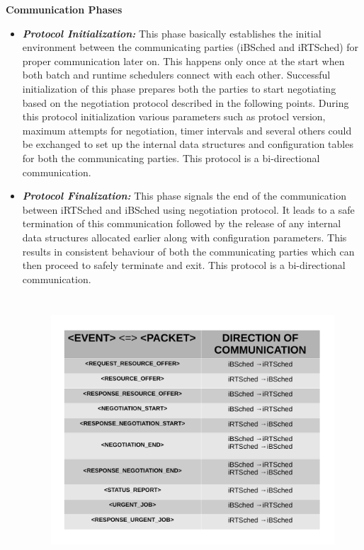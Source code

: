 \textbf{Communication Phases}
\begin{itemize}
\item \textbf{\textit{Protocol Initialization:}} This phase basically establishes the initial environment between the communicating parties (iBSched and iRTSched) for proper communication later on. This happens only once at the start when both batch and runtime schedulers connect with each other. Successful initialization of this phase prepares both the parties to start negotiating based on the negotiation protocol described in the following points. During this protocol initialization various parameters such as protocl version, maximum attempts for negotiation, timer intervals and several others could be exchanged to set up the internal data structures and configuration tables for both the communicating parties. This protocol is a bi-directional communication.
\item \textbf{\textit{Protocol Finalization:}} This phase signals the end of the communication between iRTSched and iBSched using negotiation protocol. It leads to a safe termination of this communication followed by the release of any internal data structures allocated earlier along with configuration parameters. This results in consistent behaviour of both the communicating parties which can then proceed to safely terminate and exit. This protocol is a bi-directional communication.
\begin{figure}[h]
\centering
\includegraphics[width=1.0\textwidth, height=100mm]{./figures/table.pdf}

\end{figure}
\end{itemize}
